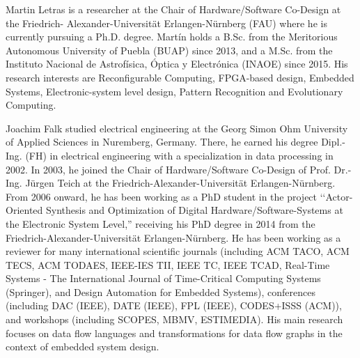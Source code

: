 \documentclass{ieeeaccess}
\begin{document}
\footnotesize


\vspace{-2.11cm}
\begin{IEEEbiography}{Martin Letras}
is a researcher at the Chair of Hardware/Software Co-Design at the Friedrich-
Alexander-Universität Erlangen-Nürnberg (FAU) where he is currently pursuing a Ph.D. degree. Martín
holds a B.Sc. from the Meritorious Autonomous University of Puebla (BUAP) since 2013, and a M.Sc.
from the Instituto Nacional de Astrofísica, Óptica y Electrónica (INAOE) since 2015. His research
interests are Reconfigurable Computing, FPGA-based design, Embedded Systems, Electronic-system
level design, Pattern Recognition and Evolutionary Computing.
\end{IEEEbiography}
\begin{IEEEbiography}{Joachim Falk}
studied electrical engineering at the Georg Simon Ohm University of Applied Sciences in Nuremberg, Germany. 
There, he earned his degree Dipl.-Ing. (FH) in electrical engineering with a specialization in data processing in 2002. 
In 2003, he joined the Chair of Hardware/Software Co-Design of Prof. Dr.-Ing. Jürgen Teich at the Friedrich-Alexander-Universität Erlangen-Nürnberg. 
From 2006 onward, he has been working as a PhD student in the project ‘‘Actor-Oriented Synthesis and Optimization of Digital Hardware/Software-Systems at the Electronic System Level,” receiving his PhD degree in 2014 from the Friedrich-Alexander-Universität Erlangen-Nürnberg. He has been working as a reviewer for many international scientific journals (including ACM TACO, ACM TECS, ACM TODAES, IEEE-IES TII, IEEE TC, IEEE TCAD, Real-Time Systems - The International Journal of Time-Critical Computing Systems (Springer), and Design Automation for Embedded Systems), conferences (including DAC (IEEE), DATE (IEEE), FPL (IEEE), CODES+ISSS (ACM)), and workshops (including SCOPES, MBMV, ESTIMEDIA). His main research focuses on data flow languages and transformations for data flow graphs in the context of embedded system design.
\end{IEEEbiography}
\end{document}
